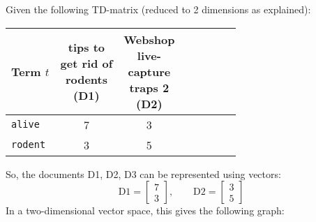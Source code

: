 \documentclass[a4paper, 11pt, accentcolor = tud3b]{tudreport}
\begin{document}
            		Given the following TD-matrix (reduced to 2 dimensions as explained):
                    \begin{table}[H]
                        \centering
                        \begin{tabular}{|l|c|c|c|c|c|c|c|}
                            \hline
                            \textbf{Term} \(t\) & \makecell{tips to \\ get rid of \\ rodents \\ (D1)} & \makecell{Webshop \\ live- \\ capture \\ traps 2 \\ (D2)} \\ \hline
                            \texttt{alive}  &         7          &         3          \\ \hline
                            \texttt{rodent} &         3          &         5          \\ \hline
                        \end{tabular}
                    \end{table}
                	So, the documents D1, D2, D3 can be represented using vectors:
                	\begin{equation*}
	                	\text{D1} =
	                		\begin{bmatrix}
		                		7 \\
		                		3
	                		\end{bmatrix},
	                	\quad\quad
	                	\text{D2} =
	                		\begin{bmatrix}
		                		3 \\
		                		5
	                		\end{bmatrix}
                	\end{equation*}
                	In a two-dimensional vector space, this gives the following graph:
                	\begin{figure}[H]
                		\centering
                	\end{figure}
\end{document}
